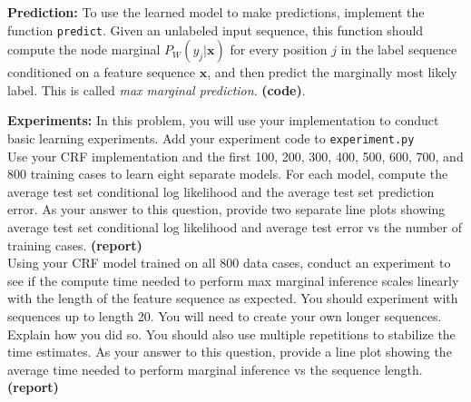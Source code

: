 \documentclass[11pt]{article}
\newcommand{\mbf}[1]{{\mathbf{#1}}}
\begin{document}
\vspace{0.25in}
\begin{problem}{10} \textbf{Prediction:} To use the learned model to make predictions, implement the function
\verb|predict|. Given an unlabeled input sequence, this function should compute the node marginal $P_W(y_j|\mbf{x})$ for
every position $j$ in the label sequence conditioned on a feature sequence $\mbf{x}$, and then predict the marginally
most likely label. This is called \textit{max marginal prediction}. \textbf{(code)}.
\end{problem}

\vspace{0.25in}
\begin{problem}{20} \textbf{Experiments:} In this problem, you will use your implementation to conduct basic
learning experiments. Add your experiment code to \verb|experiment.py|\\

 Use your CRF implementation and the first 100, 200, 300, 400, 500, 600, 700, and 800 training cases to learn eight separate models. For each model, compute the average test set conditional log likelihood and the average test set prediction error.
As your answer to this question, provide two separate line plots showing average test set conditional log likelihood and average test error vs the number of training cases. \textbf{(report)}\\

 Using your CRF model trained on all 800 data cases, conduct an experiment to see if the compute time needed to perform max marginal inference scales linearly with the length of the feature sequence as expected. You should experiment with sequences up to length 20. You will need to create your own longer sequences. Explain how you did so. You should also use multiple repetitions to stabilize the time estimates. As your answer to this question, provide a line plot showing
the average time needed to perform marginal inference vs the sequence length.  \textbf{(report)}

\end{problem}


\showpoints
\end{document}
